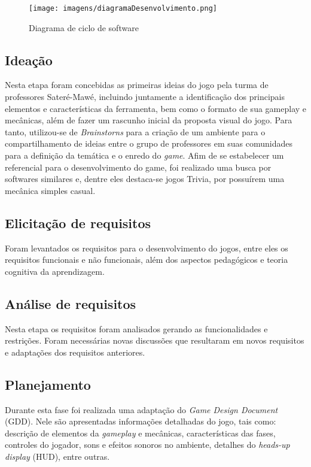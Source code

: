 \documentclass[12pt]{article}
\begin{document}
		\begin{figure}[!ht]
			\centering
			\texttt{[image: imagens/diagramaDesenvolvimento.png]}
			\caption{Diagrama de ciclo de software}
			\label{fig:diagram}
		\end{figure}
	
	\subsection{Ideação}
		Nesta etapa foram concebidas as primeiras ideias do jogo pela turma de professores Sateré-Mawé, incluindo juntamente a identificação dos principais elementos e características da ferramenta, bem como o formato de sua gameplay e mecânicas, além de fazer um rascunho inicial da proposta visual do jogo. Para tanto, utilizou-se de \textit{Brainstorns} para a criação de um ambiente para o compartilhamento de ideias entre o grupo de professores	em suas comunidades para a definição da temática e o enredo do \textit{game}. Afim de se estabelecer um referencial para o desenvolvimento do game, foi realizado uma busca por softwares similares e, dentre eles destaca-se jogos Trivia, por possuírem uma mecânica simples casual.
		
	\subsection{Elicitação de requisitos}		
		Foram levantados os requisitos para o desenvolvimento do jogos, entre eles os requisitos funcionais e não funcionais, além dos aspectos pedagógicos e teoria cognitiva da aprendizagem.
		
	\subsection{Análise de requisitos}
		Nesta etapa os requisitos foram analisados gerando as funcionalidades e restrições. Foram necessárias novas discussões que resultaram em novos requisitos e adaptações dos requisitos anteriores.
		
	\subsection{Planejamento}
		Durante esta fase foi realizada uma adaptação do \textit{Game Design Document} (GDD). Nele são apresentadas informações detalhadas do jogo, tais como: descrição de elementos da \textit{gameplay} e mecânicas, características das fases, controles do jogador, sons e efeitos sonoros no ambiente, detalhes do \textit{heads-up display} (HUD), entre outras.
	
\end{document}
